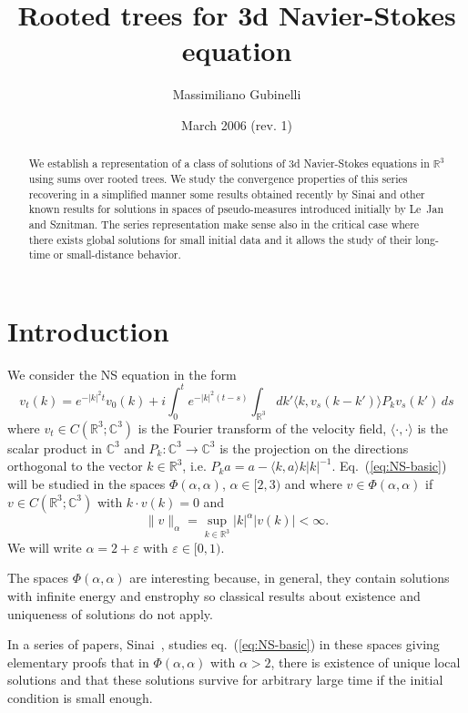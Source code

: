 \documentclass[a4paper,12pt,reqno]{amsart}
\newcommand{\1}{{\bf 1}}
\newcommand{\eps}{\varepsilon}
\newcommand{\RR}{\mathbb{R}}
\newcommand{\CC}{\mathbb{C}}
\newcommand{\R}{\mathbb R}
\begin{document}
\title{Rooted trees for  3d Navier-Stokes equation}
\author{Massimiliano Gubinelli}
\address{Dip. di Matematica Applicata ``U. Dini'' -- Universit\`a di
Pisa, Italia}
\date{March 2006 (rev. 1)}
\maketitle


\begin{abstract}
We establish a representation of a class of solutions of 3d Navier-Stokes equations in $\R^3$ using sums over rooted trees.
We study the convergence properties of this series recovering in a simplified manner some results obtained recently by Sinai and other known results for solutions in spaces of pseudo-measures introduced initially by Le~Jan and Sznitman. The series representation make sense also in the critical case where there exists global solutions for small initial data and it allows the study of their long-time or small-distance behavior.
\end{abstract}

\section{Introduction}

We consider the NS equation in the form
\begin{equation}
  \label{eq:NS-basic}
v_t(k) = e^{-|k|^2 t} v_0(k) + i \int_0^t e^{-|k|^2 (t-s)} \int_{\RR^3}dk' \langle k, v_s(k-k')\rangle P_k v_s(k') \,ds
\end{equation}
where $v_t \in C(\RR^3 ; \mathbb{C}^3)$ is the Fourier transform of
the velocity field, $\langle \cdot ,\cdot \rangle$ is the scalar
product in $\mathbb{C}^3$ and $P_k: \CC^3 \to \CC^3$ is the projection
on the directions orthogonal to the vector $k \in \RR^3$, i.e.
$
P_k a = a - \langle k,a\rangle k |k|^{-1}
$.
Eq.~(\ref{eq:NS-basic}) will be studied in the spaces
$\Phi(\alpha,\alpha)$, $\alpha \in [2,3)$ and where $v \in \Phi(\alpha,\alpha)$ if $v \in C(\RR^3;\CC^3)$ with $k \cdot v(k) = 0$ and 
$$\|v\|_\alpha = \sup_{k\in\RR^3} |k|^\alpha |v(k)| < \infty. $$
We will write $\alpha = 2+\eps$ with $\eps \in [0,1)$.

The spaces $\Phi(\alpha,\alpha)$ are interesting because, in general,
they contain solutions with infinite energy and enstrophy so classical
results about existence and uniqueness of solutions
do not apply.

In a series of papers, Sinai~\cite{Sinai1,Sinai2,Sinai3}, studies
eq.~(\ref{eq:NS-basic}) in these spaces giving elementary proofs that in
$\Phi(\alpha,\alpha)$ with $\alpha > 2$, there is existence of unique local
solutions and that these solutions survive for arbitrary large time if
the initial condition is small enough.
\end{document}
